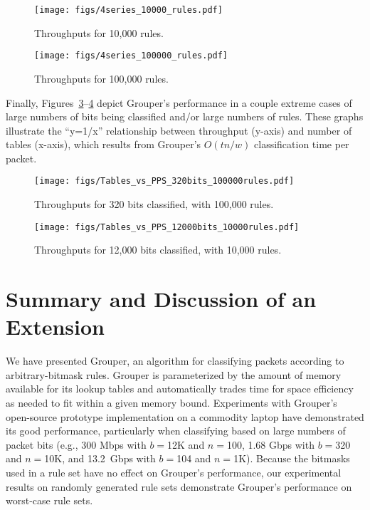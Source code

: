 \documentclass[10pt, conference, compsocconf]{IEEEtran}
\begin{document}
\begin{figure}
\vspace{-.2in}
\hspace{-.08in}\texttt{[image: figs/4series\_10000\_rules.pdf]}
\vspace{-.3in}
\caption{Throughputs for 10,000 rules.}\label{fig:10000}
\end{figure}

\begin{figure}
\vspace{-.2in}
\hspace{-.08in}\texttt{[image: figs/4series\_100000\_rules.pdf]}
\vspace{-.3in}
\caption{Throughputs for 100,000 rules.}\label{fig:100000}
\end{figure}

Finally, Figures~\ref{fig:320}--\ref{fig:12000} depict Grouper's performance in
a couple extreme cases of large numbers of bits being classified and/or large
numbers of rules.  These graphs illustrate the ``y=1/x'' relationship between
throughput (y-axis) and number of tables (x-axis), which results from Grouper's
$O(tn/w)$ classification time per packet.

\begin{figure}
\vspace{-.2in}
\hspace{-.08in}\texttt{[image: figs/Tables\_vs\_PPS\_320bits\_100000rules.pdf]}
\vspace{-.3in}
\caption{Throughputs for 320 bits classified, with 100,000 rules.}\label{fig:320}
\end{figure}

\begin{figure}
\vspace{-.2in}
\hspace{-.08in}\texttt{[image: figs/Tables\_vs\_PPS\_12000bits\_10000rules.pdf]}
\vspace{-.3in}
\caption{Throughputs for 12,000 bits classified, with 10,000 rules.}
\vspace{-.1in}
\label{fig:12000}
\end{figure}


\section{Summary and Discussion of an Extension}

We have presented Grouper, an algorithm for classifying packets according to
arbitrary-bitmask rules.  Grouper is parameterized by the amount of memory
available for its lookup tables and automatically trades time for space
efficiency as needed to fit within a given memory bound.  Experiments with
Grouper's open-source prototype implementation on a commodity laptop have
demonstrated its good performance, particularly when classifying based on large
numbers of packet bits (e.g., 300 Mbps with $b{=}$12K and $n{=}$100, 1.68 Gbps
with $b{=}$320 and $n{=}$10K, and 13.2~Gbps with $b{=}$104 and $n{=}$1K).
Because the bitmasks used in a rule set have no effect on Grouper's performance,
our experimental results on randomly generated rule sets demonstrate Grouper's
performance on worst-case rule sets.
\end{document}
